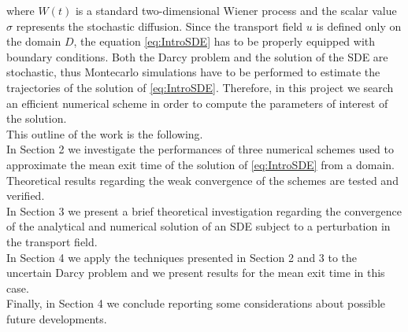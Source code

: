 where $W(t)$ is a standard two-dimensional Wiener process and the scalar value $\sigma$ represents the stochastic diffusion. Since the transport field $u$ is defined only on the domain $D$, the equation \eqref{eq:IntroSDE} has to be properly equipped with boundary conditions. Both the Darcy problem and the solution of the SDE are stochastic, thus Montecarlo simulations have to be performed to estimate the trajectories of the solution of \eqref{eq:IntroSDE}. Therefore, in this project we search an efficient numerical scheme in order to compute the parameters of interest of the solution. \\

\noindent This outline of the work is the following. \\
In Section 2 we investigate the performances of three numerical schemes used to approximate the mean exit time of the solution of \eqref{eq:IntroSDE} from a domain. Theoretical results regarding the weak convergence of the schemes are tested and verified. \\
In Section 3 we present a brief theoretical investigation regarding the convergence of the analytical and numerical solution of an SDE subject to a perturbation in the transport field. \\
In Section 4 we apply the techniques presented in Section 2 and 3 to the uncertain Darcy problem and we present results for the mean exit time in this case. \\
Finally, in Section 4 we conclude reporting some considerations about possible future developments.
